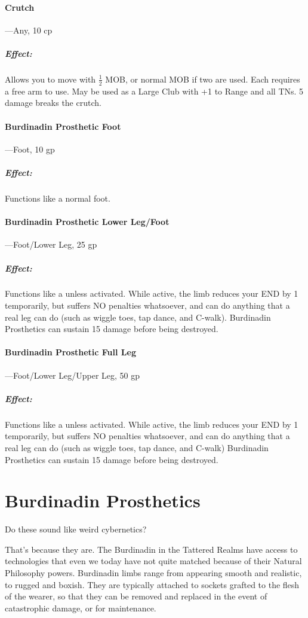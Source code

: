 \documentclass[oneside,11pt,english]{book}
\begin{document}
\paragraph{Crutch}---\quad Any, 10 cp
\vspace{-15pt} \subparagraph{Effect:} Allows you to move with $ \frac{1}{2} $ MOB, or normal MOB if two are used. Each requires a free arm to use. May be used as a Large Club with +1 to Range and all TNs. 5 damage breaks the crutch.

\paragraph{Burdinadin Prosthetic Foot}---\quad Foot, 10 gp
\vspace{-15pt} \subparagraph{Effect:} Functions like a normal foot.

\paragraph{Burdinadin Prosthetic Lower Leg/Foot}---\quad Foot/Lower Leg, 25 gp
\vspace{-15pt} \subparagraph{Effect:} Functions like a  unless activated. While active, the limb reduces your END by 1 temporarily, but suffers NO penalties whatsoever, and can do anything that a real leg can do (such as wiggle toes, tap dance, and C-walk). Burdinadin Prosthetics can sustain 15 damage before being destroyed. 

\paragraph{Burdinadin Prosthetic Full Leg}---\quad Foot/Lower Leg/Upper Leg, 50 gp
\vspace{-15pt} \subparagraph{Effect:} Functions like a  unless activated. While active, the limb reduces your END by 1 temporarily, but suffers NO penalties whatsoever, and can do anything that a real leg can do (such as wiggle toes, tap dance, and C-walk) Burdinadin Prosthetics can sustain 15 damage before being destroyed.

\section{Burdinadin Prosthetics}
Do these sound like weird cybernetics? 

That’s because they are. The Burdinadin in the Tattered Realms have access to technologies that even we today have not quite matched because of their Natural Philosophy powers. Burdinadin limbs range from 
appearing smooth and realistic, to rugged and boxish. They are typically attached to sockets grafted to the 
flesh of the wearer, so that they can be removed and replaced in the event of catastrophic damage, or for maintenance. 
\end{document}
